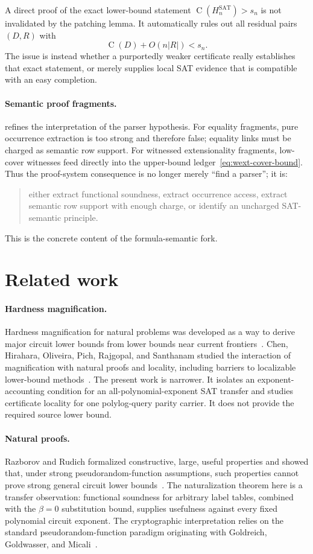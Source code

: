 \documentclass[11pt]{article}
\theoremstyle{definition}
\newcommand{\Ckt}{\operatorname{C}}
\newcommand{\SAT}{\mathrm{SAT}}
\begin{document}
A direct proof of the exact lower-bound statement $\Ckt(H_n^{\SAT})>s_n$ is not invalidated by the patching lemma. It automatically rules out all residual pairs $(D,R)$ with
\[
  \Ckt(D)+O(n|R|)<s_n.
\]
The issue is instead whether a purportedly weaker certificate really establishes that exact statement, or merely supplies local SAT evidence that is compatible with an easy completion.

\paragraph{Semantic proof fragments.}
 refines the interpretation of the parser hypothesis. For equality fragments, pure occurrence extraction is too strong and therefore false; equality links must be charged as semantic row support. For witnessed extensionality fragments, low-cover witnesses feed directly into the upper-bound ledger~\eqref{eq:wext-cover-bound}. Thus the proof-system consequence is no longer merely ``find a parser''; it is:
\begin{quote}
either extract functional soundness, extract occurrence access, extract semantic row support with enough charge, or identify an uncharged SAT-semantic principle.
\end{quote}
This is the concrete content of the formula-semantic fork.

\section{Related work}\label{sec:related}

\paragraph{Hardness magnification.}
Hardness magnification for natural problems was developed as a way to derive major circuit lower bounds from lower bounds near current frontiers~\cite{OS18,OPS19}. Chen, Hirahara, Oliveira, Pich, Rajgopal, and Santhanam studied the interaction of magnification with natural proofs and locality, including barriers to localizable lower-bound methods~\cite{CHOPRS19}. The present work is narrower. It isolates an exponent-accounting condition for an all-polynomial-exponent SAT transfer and studies certificate locality for one polylog-query parity carrier. It does not provide the required source lower bound.

\paragraph{Natural proofs.}
Razborov and Rudich formalized constructive, large, useful properties and showed that, under strong pseudorandom-function assumptions, such properties cannot prove strong general circuit lower bounds~\cite{RR97}. The naturalization theorem here is a transfer observation: functional soundness for arbitrary label tables, combined with the $\beta=0$ substitution bound, supplies usefulness against every fixed polynomial circuit exponent. The cryptographic interpretation relies on the standard pseudorandom-function paradigm originating with Goldreich, Goldwasser, and Micali~\cite{GGM86}.
\end{document}
